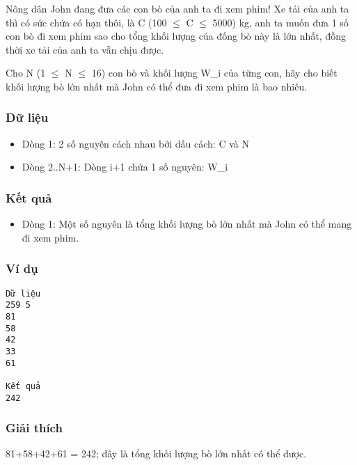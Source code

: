 



   Nông dân John đang đưa các con bò của anh ta đi xem phim! Xe tải của  anh ta thì có sức chứa có hạn thôi, là C (100  $\le$  C  $\le$  5000) kg, anh  ta muốn đưa 1 số con bò đi xem phim sao cho tổng khối lượng của đống  bò này là lớn nhất, đồng thời xe tải của anh ta vẫn chịu được.  

   Cho N (1  $\le$  N  $\le$  16) con bò và khối lượng W\_i của từng con, hãy cho  biết khối lượng bò lớn nhất mà John có thể đưa đi xem phim  là bao nhiêu.  

\subsubsection{   Dữ liệu  }
\begin{itemize}
	\item     Dòng 1: 2 số nguyên cách nhau bởi dấu cách: C và N   
	\item     Dòng 2..N+1: Dòng i+1 chứa 1 số nguyên: W\_i   
\end{itemize}

\subsubsection{   Kết quả  }
\begin{itemize}
	\item     Dòng 1: Một số nguyên là tổng khối lượng bò lớn nhất mà John        có thể mang đi xem phim.   
\end{itemize}

\subsubsection{   Ví dụ  }
\begin{verbatim}
Dữ liệu
259 5
81
58
42
33
61

Kết quả
242
\end{verbatim}

\subsubsection{   Giải thích  }

   81+58+42+61 = 242; đây là tổng khối lượng bò lớn nhất có thể được.  
